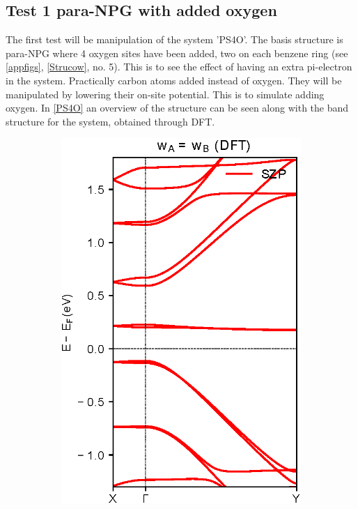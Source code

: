 \subsection{Test 1 para-NPG with added oxygen}
The first test will be manipulation of the system 'PS4O'. The basis structure is para-NPG where 4 oxygen sites have been added, two on each benzene ring (see \cref{appfigs}, \cref{Strucow}, no. 5). This is to see the effect of having an extra pi-electron in the system. Practically carbon atoms added instead of oxygen. They will be manipulated by lowering their on-site potential. This is to simulate adding oxygen. In \cref{PS4O} an overview of the structure can be seen along with the band structure for the system, obtained through DFT. 
\begin{figure}[h]
    \centering
    \begin{subfigure}[b]{0.3\textwidth}
    \centering
    \includegraphics[width=\textwidth]{Figures/PS4ODFT.eps}

\end{subfigure}
\end{figure}
